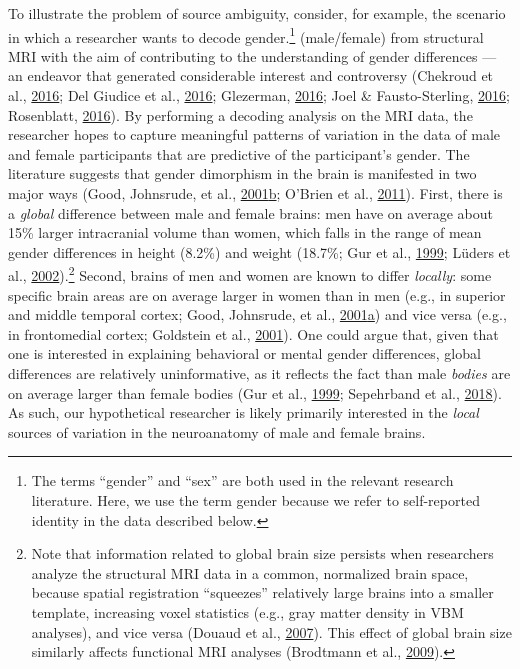 \documentclass[12pt,american,a4paper,oneside,]{memoir} %
\let\rmarkdownfootnote\footnote%
\def\footnote{\protect\rmarkdownfootnote}
\begin{document}
To illustrate the problem of source ambiguity, consider, for example, the scenario in which a researcher wants to decode gender.\footnote{The terms ``gender'' and ``sex'' are both used in the relevant research literature. Here, we use the term gender because we refer to self-reported identity in the data described below.} (male/female) from structural MRI with the aim of contributing to the understanding of gender differences --- an endeavor that generated considerable interest and controversy (Chekroud et al., \protect\hyperlink{ref-Chekroud2016-tc}{2016}; Del Giudice et al., \protect\hyperlink{ref-Del_Giudice2016-ns}{2016}; Glezerman, \protect\hyperlink{ref-Glezerman2016-xl}{2016}; Joel \& Fausto-Sterling, \protect\hyperlink{ref-Joel2016-uo}{2016}; Rosenblatt, \protect\hyperlink{ref-Rosenblatt2016-oy}{2016}). By performing a decoding analysis on the MRI data, the researcher hopes to capture meaningful patterns of variation in the data of male and female participants that are predictive of the participant's gender. The literature suggests that gender dimorphism in the brain is manifested in two major ways (Good, Johnsrude, et al., \protect\hyperlink{ref-Good2001-kv}{2001}\protect\hyperlink{ref-Good2001-kv}{b}; O'Brien et al., \protect\hyperlink{ref-OBrien2011-lj}{2011}). First, there is a \emph{global} difference between male and female brains: men have on average about 15\% larger intracranial volume than women, which falls in the range of mean gender differences in height (8.2\%) and weight (18.7\%; Gur et al., \protect\hyperlink{ref-Gur1999-qj}{1999}; Lüders et al., \protect\hyperlink{ref-Luders2002-ms}{2002}).\footnote{Note that information related to global brain size persists when researchers analyze the structural MRI data in a common, normalized brain space, because spatial registration ``squeezes'' relatively large brains into a smaller template, increasing voxel statistics (e.g., gray matter density in VBM analyses), and vice versa (Douaud et al., \protect\hyperlink{ref-Douaud2007-sw}{2007}). This effect of global brain size similarly affects functional MRI analyses (Brodtmann et al., \protect\hyperlink{ref-brodtmann2009regional}{2009}).} Second, brains of men and women are known to differ \emph{locally}: some specific brain areas are on average larger in women than in men (e.g., in superior and middle temporal cortex; Good, Johnsrude, et al., \protect\hyperlink{ref-Good2001-ak}{2001}\protect\hyperlink{ref-Good2001-ak}{a}) and vice versa (e.g., in frontomedial cortex; Goldstein et al., \protect\hyperlink{ref-Goldstein2001-dy}{2001}). One could argue that, given that one is interested in explaining behavioral or mental gender differences, global differences are relatively uninformative, as it reflects the fact than male \emph{bodies} are on average larger than female bodies (Gur et al., \protect\hyperlink{ref-Gur1999-qj}{1999}; Sepehrband et al., \protect\hyperlink{ref-Sepehrband2018-dy}{2018}). As such, our hypothetical researcher is likely primarily interested in the \emph{local} sources of variation in the neuroanatomy of male and female brains.
\end{document}
